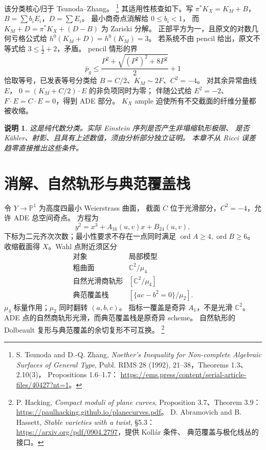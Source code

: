 \documentclass[UTF8,fontset=fandol,zihao=-4,oneside,openany]{ctexbook}
\theoremstyle{cjkplain}
\newtheorem{remark}[theorem]{说明}
\numberwithin{equation}{chapter}
\begin{document}
该分类核心归于 Tsunoda--Zhang。
\footnote{S. Tsunoda and D.-Q. Zhang,
\emph{Noether's Inequality for Non-complete Algebraic Surfaces of General Type},
Publ. RIMS 28 (1992), 21--38，Theorems 1.3、2.10(3)，
Propositions 1.6--1.7：
\url{https://ems.press/content/serial-article-files/40427?nt=1}。}
其适用性核查如下。写
$\pi^*K_X=K_M+B$，$B=\sum b_iE_i$，$D=\sum E_i$。
最小商奇点消解给 $0\le b_i<1$，
而 $K_M+D=\pi^*K_X+(D-B)$ 为 Zariski 分解。
正部平方为一，且原文的对数几何亏格公式给
$h^0(K_M+D)=h^0(K_M)=3$。
若系统不由 pencil 给出，原文不等式给 $3\le\frac12+2$，矛盾。
pencil 情形的界
\[
\overline p_g\le
\frac{P^2+\sqrt{(P^2)^2+8P^2}}2+1
\]
恰取等号，已发表等号分类给 $B=C/2$、$K_M\sim2F$、$C^2=-4$。
对其余异常曲线 $E$，
$0=(K_M+C/2)\cdot E$ 的非负项同时为零；
伴随公式给 $E^2=-2$、$F\cdot E=C\cdot E=0$，得到 ADE 部分。
$K_X$ ample 迫使所有不交截面的纤维分量都被收缩。

\begin{remark}
这是纯代数分类。实际 Einstein 序列是否产生非塌缩轨形极限、
是否 Kähler、射影、且具有上述数值，须由分析部分独立证明。
本章不从 Ricci 误差趋零直接推出这些条件。
\end{remark}

\section{消解、自然轨形与典范覆盖栈}

令 $Y\to\mathbb P^1$ 为高度四最小 Weierstrass 曲面，
截面 $C$ 位于光滑部分，$C^2=-4$，允许 ADE 总空间奇点。
方程为
\begin{equation}
y^2=x^3+A_{16}(u,v)x+B_{24}(u,v),
\label{ALG:weierstrass}
\end{equation}
下标为二元齐次次数；最小性要求不存在一点同时满足
$\operatorname{ord}A\ge4,\operatorname{ord}B\ge6$。
收缩截面得 $X$。Wahl 点附近须区分
\[
\begin{array}{c|c}
\text{对象}&\text{局部模型}\\ \hline
\text{粗曲面}&\mathbb C^2/\mu_4\\
\text{自然光滑商轨形}&[\mathbb C^2/\mu_4]\\
\text{典范覆盖栈}&[\{ac-b^2=0\}/\mu_2].
\end{array}
\]
$\mu_4$ 标量作用；$\mu_2$ 同时翻转 $(a,b,c)$。
指标一覆盖是奇异 $A_1$，不是光滑 $\mathbb C^2$。
ADE 点的自然商轨形光滑，而典范覆盖栈是原奇异 scheme。
自然轨形的 Dolbeault 复形与典范覆盖的余切复形不可互换。
\footnote{P. Hacking, \emph{Compact moduli of plane curves},
Proposition 3.7、Theorem 3.9：
\url{https://paulhacking.github.io/planecurves.pdf}。
D. Abramovich and B. Hassett, \emph{Stable varieties with a twist}, \S5.3：
\url{https://arxiv.org/pdf/0904.2797}，提供 Kollár 条件、
典范覆盖与极化线丛的接口。}
\end{document}
